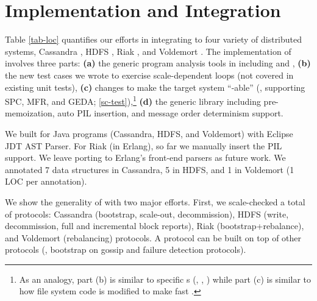 
\section{Implementation and Integration}
\label{sec-impl}





Table \ref{tab-loc} quantifies our efforts
in integrating \sck 
to four variety of distributed systems, 
Cassandra \cite{Lakshman+09-Cassandra}, 
HDFS \cite{HDFSWeb}, 
Riak \cite{RiakWeb}, and
Voldemort \cite{VoldemortWeb}.
%
The implementation of \sck involves three parts:
%
{\bf (a)} the generic program analysis tools in including \sfind and
\sfindp,
%
{\bf (b)} the new test cases we wrote to 
exercise scale-dependent loops (not covered in existing unit tests),
%
{\bf (c)} changes to make the target system ``\stest-able'' (\ie,
supporting SPC, MFR, and GEDA; \sec\ref{sc-test}),\footnote{As an analogy,
  part (b) is similar to specific s (\eg, ,
  ) while part (c) is similar to how file system code is
  modified to make  fast \cite{Henson+06-Chunkfs, Ma+13-Ffsck}.}
%
{\bf (d)} the generic \stest library including
pre-memoization, auto PIL insertion, and message order determinism support.
%


We built \sfind for Java programs (Cassandra, HDFS, and Voldemort) with
Eclipse JDT AST Parser.  For Riak (in Erlang), so far we manually insert
the PIL support.  We leave porting \sfind to Erlang's front-end parsers
\cite{Erlang-Elvis, Erlang-Dialyzer} as future work.
%
We annotated 7 data structures in Cassandra, 
5 in HDFS, and 1 in Voldemort (1 LOC per annotation).




 We show the generality of \sck with two major
efforts.  First, we scale-checked a total of \numProt protocols:
%
\numProtCass Cassandra (bootstrap, scale-out, decommission),
%
\numProtHDFS HDFS (write, decommission, full and incremental block reports),
%
\numProtRiak Riak (bootstrap+rebalance), and 
%
\numProtVold Voldemort (rebalancing) protocols.
%
A protocol can be built on top of other protocols (\eg, bootstrap on
gossip and failure detection protocols).



